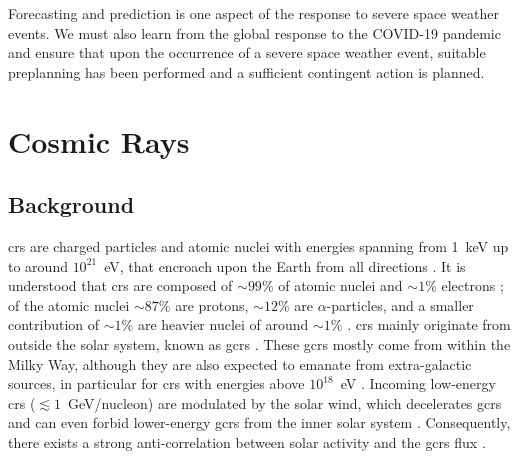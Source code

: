 Forecasting and prediction is one aspect of the response to severe space weather events. We must also learn from the global response to the COVID-19 pandemic and ensure that upon the occurrence of a severe space weather event, suitable preplanning has been performed and a sufficient contingent action is planned.





\glsresetall 
{}
\section{Cosmic Rays}\label{sec:intro_CRs}

\subsection{Background}

\glspl{cr} are charged particles and atomic nuclei with energies spanning from 1~keV up to around $10^{21}$~eV, that encroach upon the Earth from all directions \citep{giacalone_energetic_2010}. It is understood that \glspl{cr} are composed of $\sim99\%$ of atomic nuclei and $\sim1\%$ electrons \citep{gaisser_cosmic_2016}; of the atomic nuclei $\sim87\%$ are protons, $\sim12\%$ are $\alpha$-particles, and a smaller contribution of $\sim1\%$ are heavier nuclei of around $\sim1\%$ \citep{grupen_astroparticle_2005, dunai_cosmic_2010, particle_data_group_review_2020}. \glspl{cr} mainly originate from outside the solar system, known as \glspl{gcr} \citep{particle_data_group_review_2020}. These \glspl{gcr} mostly come from within the Milky Way, although they are also expected to emanate from extra-galactic sources, in particular for \glspl{cr} with energies above $10^{18}$~eV \citep{aab_observation_2017}. Incoming low-energy \glspl{cr} ($\lesssim1$~GeV/nucleon) are modulated by the solar wind, which decelerates \glspl{gcr} and can even forbid lower-energy \glspl{gcr} from the inner solar system \citep{grupen_astroparticle_2005}. Consequently, there exists a strong anti-correlation between solar activity and the \glspl{gcr} flux \citep{particle_data_group_review_2020}.

